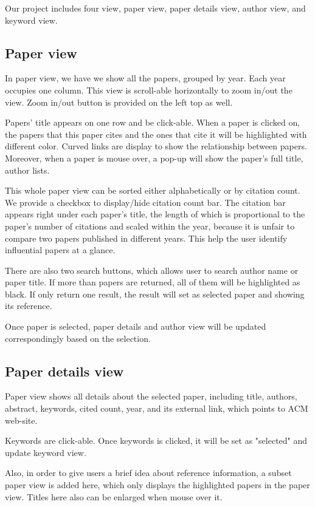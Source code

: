 Our project includes four view, paper view, paper details view, author view, and keyword view.
\subsection{Paper view}
In paper view, we have we show all the papers, grouped by year. Each year occupies one column. This view is scroll-able horizontally to zoom in/out the view. Zoom in/out button is provided on the left top as well.

Papers' title appears on one row and be click-able. When a paper is clicked on, the papers that this paper cites and the ones that cite it will be highlighted with different color. Curved links are display to show the relationship between papers. Moreover, when a paper is mouse over, a pop-up will show the paper's full title, author lists. 

This whole paper view can be sorted either alphabetically or by citation count. We provide a checkbox to display/hide citation count bar. The citation bar appears right under each paper's title, the length of which is proportional to the paper's number of citations and scaled within the year, because it is unfair to compare two papers published in different years. This help the user identify influential papers at a glance.

There are also two search buttons, which allows user to search author name or paper title. If more than papers are returned, all of them will be highlighted as black. If only return one result, the result will set as selected paper and showing its reference.

Once paper is selected, paper details and author view will be updated correspondingly based on the selection.

\subsection{Paper details view}
Paper view shows all details about the selected paper, including title, authors, abstract, keywords, cited count, year, and its external link, which points to ACM web-site.

Keywords are click-able. Once keywords is clicked, it will be set as "selected" and update keyword view.

Also, in order to give users a brief idea about reference information, a subset paper view is added here, which only displays the highlighted papers in the paper view. Titles here also can be enlarged when mouse over it.

